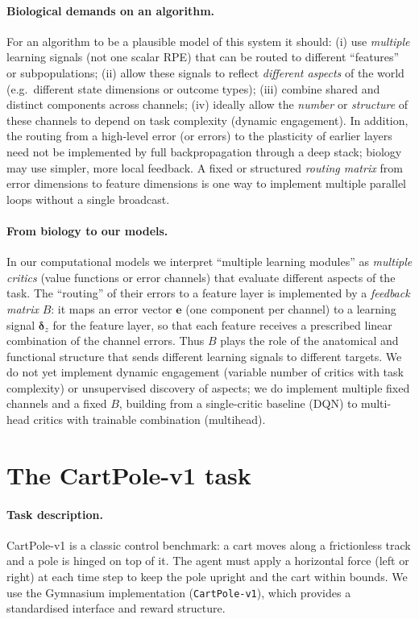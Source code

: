 \documentclass[11pt]{article}
\begin{document}
\paragraph{Biological demands on an algorithm.} For an algorithm to be a plausible model of this system it should: (i) use \emph{multiple} learning signals (not one scalar RPE) that can be routed to different ``features'' or subpopulations; (ii) allow these signals to reflect \emph{different aspects} of the world (e.g.\ different state dimensions or outcome types); (iii) combine shared and distinct components across channels; (iv) ideally allow the \emph{number} or \emph{structure} of these channels to depend on task complexity (dynamic engagement). In addition, the routing from a high-level error (or errors) to the plasticity of earlier layers need not be implemented by full backpropagation through a deep stack; biology may use simpler, more local feedback. A fixed or structured \emph{routing matrix} from error dimensions to feature dimensions is one way to implement multiple parallel loops without a single broadcast.

\paragraph{From biology to our models.} In our computational models we interpret ``multiple learning modules'' as \emph{multiple critics} (value functions or error channels) that evaluate different aspects of the task. The ``routing'' of their errors to a feature layer is implemented by a \emph{feedback matrix} $B$: it maps an error vector $\mathbf{e}$ (one component per channel) to a learning signal $\boldsymbol{\delta}_z$ for the feature layer, so that each feature receives a prescribed linear combination of the channel errors. Thus $B$ plays the role of the anatomical and functional structure that sends different learning signals to different targets. We do not yet implement dynamic engagement (variable number of critics with task complexity) or unsupervised discovery of aspects; we do implement multiple fixed channels and a fixed $B$, building from a single-critic baseline (DQN) to multi-head critics with trainable combination (multihead).

\section{The CartPole-v1 task}

\paragraph{Task description.} CartPole-v1 is a classic control benchmark: a cart moves along a frictionless track and a pole is hinged on top of it. The agent must apply a horizontal force (left or right) at each time step to keep the pole upright and the cart within bounds. We use the Gymnasium implementation (\texttt{CartPole-v1}), which provides a standardised interface and reward structure.
\end{document}
